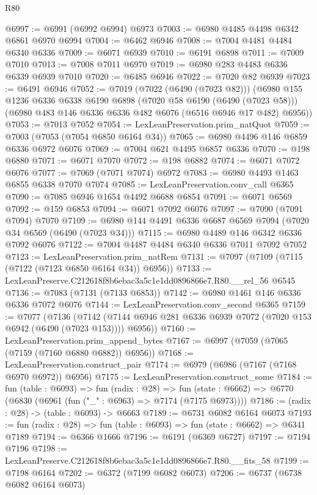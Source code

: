\begin{lexlean}{R80}
\begin{coremodule}
@6997 := @6991 (@6992 @6994) @6973
@7003 := @6980 @4485 @4498 @6342 @6861 @6970 @6994
@7004 := @6462 @6946
@7008 := @7004 @4481 @4484 @6340 @6336
@7009 := @6071 @6939
@7010 := @6191 @6898
@7011 := @7009 @7010
@7013 := @7008 @7011 @6970
@7019 := @6980 @283 @4483 @6336 @6339 @6939 @7010
@7020 := @6485 @6946
@7022 := @7020 @82 @6939
@7023 := @6491 @6946
@7052 := @7019
    (@7022 (@6490 (@7023 @82)))
    (@6980
      @155
      @1236
      @6336
      @6338
      @6190
      @6898
      (@7020 @58 @6190 (@6490 (@7023 @58)))
      (@6980 @483 @146 @6336 @6336 @482 @6076 (@6516 @6946 @17 @482) @6956))
@7053 := @7013 @7052
@7054 := LexLeanPreservation.prim_natQuot
@7059 := @7003 (@7053 (@7054 @6850 @6164 @34))
@7065 := @6980 @4496 @146 @6859 @6336 @6972 @6076
@7069 := @7004 @621 @4495 @6857 @6336
@7070 := @198 @6880
@7071 := @6071 @7070
@7072 := @198 @6882
@7074 := @6071 @7072 @6076
@7077 := @7069 (@7071 @7074) @6972
@7083 := @6980 @4493 @1463 @6855 @6338 @7070 @7074
@7085 := LexLeanPreservation.conv_call @6365
@7090 := @7085 @6946 @1654 @4492 @6688 @6854
@7091 := @6071 @6569
@7092 := @159 @6853
@7094 := @6071 @7092 @6076
@7097 := @7090 (@7091 @7094) @7070
@7109 := @6980 @144 @4491 @6336 @6687 @6569 @7094 (@7020 @34 @6569 (@6490 (@7023 @34)))
@7115 := @6980 @4489 @146 @6342 @6336 @7092 @6076
@7122 := @7004 @4487 @4484 @6340 @6336 @7011 @7092 @7052
@7123 := LexLeanPreservation.prim_natRem
@7131 := @7097 (@7109 (@7115 (@7122 (@7123 @6850 @6164 @34)) @6956))
@7133 := LexLeanPreserve.C212618f8b6ebac3a5c1e1dd0896866e7.R80.__rel_56 @6545
@7136 := @7083 (@7131 (@7133 @6853))
@7142 := @6980 @1461 @146 @6336 @6336 @7072 @6076
@7144 := LexLeanPreservation.conv_second @6365
@7159 := @7077
    (@7136
      (@7142 (@7144 @6946 @281 @6336 @6939 @7072 (@7020 @153 @6942 (@6490 (@7023 @153)))) @6956))
@7160 := LexLeanPreservation.prim_append_bytes
@7167 := @6997 (@7059 (@7065 (@7159 (@7160 @6880 @6882)) @6956))
@7168 := LexLeanPreservation.construct_pair
@7174 := @6979 (@6986 (@7167 (@7168 @6970 @6972)) @6956)
@7175 := LexLeanPreservation.construct_some
@7184 := fun (table : @6093) =>
  fun (radix : @28) =>
  fun (state : @6662) => @6770 (@6830 (@6961 (fun ("_" : @6963) => @7174 (@7175 @6973))))
@7186 := (radix : @28) -> (table : @6093) -> @6663
@7189 := @6731 @6082 @6164 @6073
@7193 := fun (radix : @28) => fun (table : @6093) => fun (state : @6662) => @6341 @7189
@7194 := @6366 @1666
@7196 := @6191 (@6369 @6727)
@7197 := @7194 @7196
@7198 := LexLeanPreserve.C212618f8b6ebac3a5c1e1dd0896866e7.R80.__fits_58
@7199 := @7198 @6164
@7202 := @6372 (@7199 @6082 @6073)
@7206 := @6737 (@6738 @6082 @6164 @6073)

\end{coremodule}
\end{lexlean}
